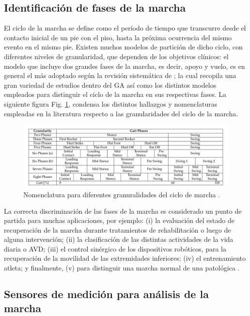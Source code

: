 \subsection{Identificación de fases de la marcha}

El ciclo de la marcha se define como el período de tiempo que transcurre desde el contacto inicial de un pie con el piso, hasta la próxima ocurrencia del mismo evento en el mismo pie. Existen muchos modelos de partición de dicho ciclo, con diferentes niveles de granularidad, que dependen de los objetivos clínicos: el modelo que incluye dos grandes fases de la marcha, es decir, apoyo y vuelo, es en general el más adoptado según la revisión sistemática de \cite{Taborri2016}; la cual recopila una gran variedad de estudios dentro del GA así como los distintos modelos empleados para distinguir el ciclo de la marcha en sus respectivas fases. La siguiente figura Fig. \ref{fig:gait-phases}, condensa los distintos hallazgos y nomenclaturas empleadas en la literatura respecto a las granularidades del ciclo de la marcha.

\begin{figure}[H]
\includegraphics[width=\textwidth]{TESIS/imagenes/chap02/Gait-phases-classification.png}
\caption{ Nomenclatura para diferentes granuralidades del ciclo de marcha \cite{Taborri2016}.}
\label{fig:gait-phases}
\end{figure}

La correcta discriminación de las fases de la marcha es considerado un punto de partida para muchas aplicaciones, por ejemplo: (i) la evaluación del estado de recuperación de la marcha durante tratamientos de rehabilitación o luego de alguna intervención; (ii) la clasificación de las distintas actividades de la vida diaria o AVD; (iii) el control sinérgico de los dispositivos robóticos, para la recuperación de la movilidad de las extremidades inferiores; (iv) el entrenamiento atleta; y finalmente, (v) para distinguir una marcha normal de una patológica \cite{Taborri2016}.

\subsection{Sensores de medición para análisis de la marcha}


